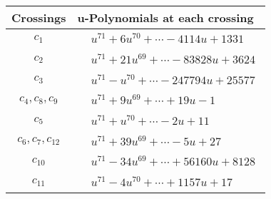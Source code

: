 \documentclass[1p]{elsarticle_modified}
\theoremstyle{definition}
\begin{document}
\begin{tabular}{m{50pt}|m{274pt}}
Crossings & \hspace{64pt}u-Polynomials at each crossing \\
\hline $$\begin{aligned}c_{1}\end{aligned}$$&$\begin{aligned}
&u^{71}+6 u^{70}+\cdots-4114 u+1331
\end{aligned}$\\
\hline $$\begin{aligned}c_{2}\end{aligned}$$&$\begin{aligned}
&u^{71}+21 u^{69}+\cdots-83828 u+3624
\end{aligned}$\\
\hline $$\begin{aligned}c_{3}\end{aligned}$$&$\begin{aligned}
&u^{71}- u^{70}+\cdots-247794 u+25577
\end{aligned}$\\
\hline $$\begin{aligned}c_{4},c_{8},c_{9}\end{aligned}$$&$\begin{aligned}
&u^{71}+9 u^{69}+\cdots+19 u-1
\end{aligned}$\\
\hline $$\begin{aligned}c_{5}\end{aligned}$$&$\begin{aligned}
&u^{71}+u^{70}+\cdots-2 u+11
\end{aligned}$\\
\hline $$\begin{aligned}c_{6},c_{7},c_{12}\end{aligned}$$&$\begin{aligned}
&u^{71}+39 u^{69}+\cdots-5 u+27
\end{aligned}$\\
\hline $$\begin{aligned}c_{10}\end{aligned}$$&$\begin{aligned}
&u^{71}-34 u^{69}+\cdots+56160 u+8128
\end{aligned}$\\
\hline $$\begin{aligned}c_{11}\end{aligned}$$&$\begin{aligned}
&u^{71}-4 u^{70}+\cdots+1157 u+17
\end{aligned}$\\
\hline
\end{tabular}\\~\\
\end{document}

